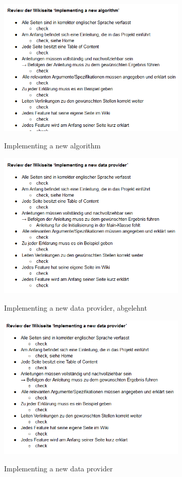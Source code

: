 \documentclass[accentcolor=tud0b,12pt,paper=a4]{tudreport}
\begin{document}
\begin{figure}[h]
\centering
\caption{Implementing a new algorithm}
\includegraphics[width=0.8\textwidth]{wiki8}
\label{wiki8}
\end{figure}

\begin{figure}[h]
\centering
\caption{Implementing a new data provider, abgelehnt}
\includegraphics[width=0.8\textwidth]{wiki9}
\label{wiki9}
\end{figure}

\begin{figure}[h]
\centering
\caption{Implementing a new data provider}
\includegraphics[width=0.8\textwidth]{wiki10}
\label{wiki10}
\end{figure}
\end{document}
